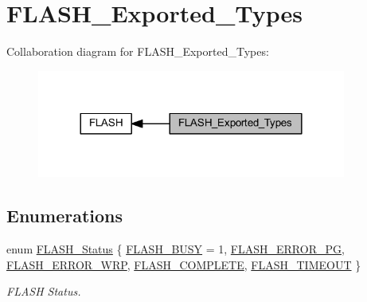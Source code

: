 \hypertarget{group___f_l_a_s_h___exported___types}{}\section{F\+L\+A\+S\+H\+\_\+\+Exported\+\_\+\+Types}
\label{group___f_l_a_s_h___exported___types}
Collaboration diagram for F\+L\+A\+S\+H\+\_\+\+Exported\+\_\+\+Types\+:
\nopagebreak
\begin{figure}[H]
\begin{center}
\leavevmode
\includegraphics[width=288pt]{group___f_l_a_s_h___exported___types}
\end{center}
\end{figure}
\subsection*{Enumerations}
\begin{DoxyCompactItemize}
\item 
enum \hyperlink{group___f_l_a_s_h___exported___types_gadc63a6f3404ff1f71229a66915e9cdc0}{F\+L\+A\+S\+H\+\_\+\+Status} \{ \newline
\hyperlink{group___f_l_a_s_h___exported___types_ggadc63a6f3404ff1f71229a66915e9cdc0aa25021d41842af8a68cefcb65949e099}{F\+L\+A\+S\+H\+\_\+\+B\+U\+SY} = 1, 
\hyperlink{group___f_l_a_s_h___exported___types_ggadc63a6f3404ff1f71229a66915e9cdc0adcb0c5002fc757739886a2601a3981da}{F\+L\+A\+S\+H\+\_\+\+E\+R\+R\+O\+R\+\_\+\+PG}, 
\hyperlink{group___f_l_a_s_h___exported___types_ggadc63a6f3404ff1f71229a66915e9cdc0ac9e2d95d3ba415fb7392d72a2458f4d8}{F\+L\+A\+S\+H\+\_\+\+E\+R\+R\+O\+R\+\_\+\+W\+RP}, 
\hyperlink{group___f_l_a_s_h___exported___types_ggadc63a6f3404ff1f71229a66915e9cdc0ab0e88e9f59edee379a1a710a8b7deebf}{F\+L\+A\+S\+H\+\_\+\+C\+O\+M\+P\+L\+E\+TE}, 
\newline
\hyperlink{group___f_l_a_s_h___exported___types_ggadc63a6f3404ff1f71229a66915e9cdc0a90c514b6a619e3a4e6c2eec3154323f8}{F\+L\+A\+S\+H\+\_\+\+T\+I\+M\+E\+O\+UT}
 \}\begin{DoxyCompactList}\small\item\em F\+L\+A\+SH Status. \end{DoxyCompactList}
\end{DoxyCompactItemize}


